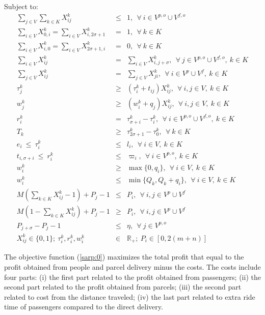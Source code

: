 \documentclass[preprint,authoryear,12pt]{elsarticle}
\begin{document}
Subject to:
\vspace{-1em}
\begin{eqnarray}
\sum\limits_{j\in V}\sum\limits_{k\in K}X_{ij}^{k} &\leq& 1, ~~ \forall~i\in V^{p,o}\cup V^{f,o} \label{sarp:1}\\
\sum\limits_{i\in V}X_{0,i}^{k}= \sum\limits_{i\in V}X_{i,2\sigma+1}^{k} &=& 1, ~~\forall~k\in K  \label{sarp:2}\\
\sum\limits_{i\in V}X_{i,0}^{k}= \sum\limits_{i\in V}X_{2\sigma+1, i}^{k} &=& 0, ~~\forall~k\in K  \label{sarp:3}\\
\sum\limits_{i\in V}X_{ij}^{k} &=& \sum\limits_{i\in V}X_{i,j+\sigma}^{k}, ~~ \forall~j\in V^{p,o}\cup V^{f,o},~k\in K \label{sarp:4}\\
\sum\limits_{j\in V}X_{ij}^{k} &=& \sum\limits_{j\in V}X_{ji}^{k}, ~~ \forall~i\in V^p\cup V^f,~k\in K \label{sarp:5}\\
\tau_j^k &\geq& (\tau_i^k + t_{ij})X_{ij}^{k},   ~~ \forall~i,j\in V,~k\in K \label{sarp:6}\\
w_j^k &\geq& (w_i^k + q_{j})X_{ij}^{k},    ~~ \forall~i,j\in V,~k\in K \label{sarp:7} \\
r_{i}^{k} &=& \tau_{\sigma+i}^k- \tau_{i}^k, ~~\forall~i\in V^{p,o}\cup V^{f,o},~k\in K \label{sarp:8}\\
T_k & \geq & \tau_{2\sigma+1}^{k}-\tau_{0}^{k}, ~~\forall~k\in K \label{sarp:9}\\
e_i~\leq~ \tau_{i}^{k} &\leq& l_i ,~~\forall~i\in V,~k\in K \label{sarp:10}\\
t_{i,\sigma+i}~\leq~r_i^k &\leq& \varpi_i,~~\forall~i\in V^{p,o},~k\in K \label{sarp:11}\\
w_i^k &\geq & \max\{0,q_i\},~~\forall~i\in V,~k\in K \label{sarp:12}\\
w_i^k &\leq & \min\{Q_k,Q_k+q_i\},~~\forall~i\in V,~k\in K \label{sarp:13}\\
M(\sum\limits_{k\in K}X_{ij}^k-1)+P_j-1&\leq& P_i, ~~\forall~i, j\in V^p\cup V^f\label{sarp:14}\\
M(1-\sum\limits_{k\in K}X_{ij}^k)+P_j-1&\geq& P_i, ~~\forall~i, j\in V^p\cup V^f\label{sarp:15}\\
P_{j+\sigma}-P_j-1 &\leq& \eta, ~~\forall~j\in V^{p,o}\label{sarp:16}\\
X_{ij}^k \in \{0,1\};~\tau_i^k,r_i^k,w_i^k &\in& \mathbb{R}_+;~P_i\in [0,2(m+n)]
\end{eqnarray}

The objective function (\ref{sarp:0}) maximizes the total profit that equal to the profit obtained from people and parcel delivery minus the costs. The costs include four parts: (i) the first part  related to the profit obtained from passengers; (ii) the second part related to the profit obtained from parcels; (iii) the second part related to cost from the distance traveled; (iv) the last part related to extra ride time of passengers compared to the direct delivery.
\end{document}
